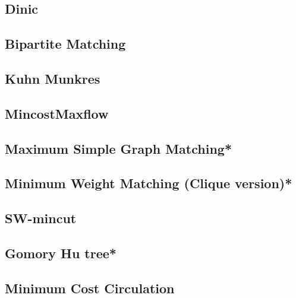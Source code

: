 \subsection{Dinic}

\subsection{Bipartite Matching} %

\subsection{Kuhn Munkres}

\subsection{MincostMaxflow}

\subsection{Maximum Simple Graph Matching*} %

\subsection{Minimum Weight Matching (Clique version)*} %

\subsection{SW-mincut}

% 
\subsection{Gomory Hu tree*} %

\subsection{Minimum Cost Circulation}

